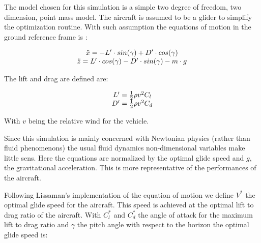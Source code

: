 

\par The model chosen for this simulation is a simple two degree of freedom, two dimension, point mass model. 
The aircraft is assumed to be a glider to simplify the optimization routine. 
With such assumption the equations of motion in the ground reference frame is :

\begin{equation}
	\begin{array}[c]{c}
		\ddot{x}= -L' \cdot sin(\gamma) + D' \cdot cos(\gamma) \\ 
		\ddot{z}= L' \cdot cos(\gamma) - D' \cdot sin(\gamma) - m \cdot g
	\end{array}
	\label{eqn:eqm}
\end{equation}


\par The lift and drag are defined are: 

\begin{equation}
	\begin{array}[c]{c}
		L'= \frac{1}{2} \rho v^2 C_l \\ 
		D'= \frac{1}{2} \rho v^2 C_d 
	\end{array}
	\label{eqn:Cl_def}
\end{equation}

\par With $v$ being the relative wind for the vehicle.

\par Since this simulation is mainly concerned with Newtonian physics (rather than fluid phenomenons) the usual fluid dynamics non-dimensional variables make little sens.
Here the equations are normalized by the optimal glide speed and $g$, the gravitational acceleration.
This is more representative of the performances of the aircraft.

\par Following Lissaman's \cite{lissaman2005wind} implementation of the equation of motion we define $V^*$ the optimal glide speed for the aircraft. 
This speed is achieved at the optimal lift to drag ratio of the aircraft.
With $C_l^*$ and $C_d^*$ the angle of attack for the maximum lift to drag ratio and $\gamma$ the pitch angle with respect to the horizon the optimal glide speed is:

